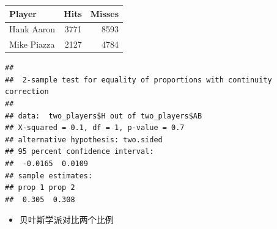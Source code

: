\documentclass[]{book}
\newenvironment{Shaded}{\begin{snugshade}}{\end{snugshade}}
\newcommand{\DataTypeTok}[1]{\textcolor[rgb]{0.13,0.29,0.53}{#1}}
\newcommand{\KeywordTok}[1]{\textcolor[rgb]{0.13,0.29,0.53}{\textbf{#1}}}
\newcommand{\NormalTok}[1]{#1}
\newcommand{\OperatorTok}[1]{\textcolor[rgb]{0.81,0.36,0.00}{\textbf{#1}}}
\newcommand{\StringTok}[1]{\textcolor[rgb]{0.31,0.60,0.02}{#1}}
\providecommand{\tightlist}{%
  \setlength{\itemsep}{0pt}\setlength{\parskip}{0pt}}
\begin{document}
\begin{Shaded}
\end{Shaded}

\begin{tabular}{l|r|r}
\hline
Player & Hits & Misses\\
\hline
Hank Aaron & 3771 & 8593\\
\hline
Mike Piazza & 2127 & 4784\\
\hline
\end{tabular}

\begin{Shaded}
\end{Shaded}

\begin{verbatim}
## 
##  2-sample test for equality of proportions with continuity correction
## 
## data:  two_players$H out of two_players$AB
## X-squared = 0.1, df = 1, p-value = 0.7
## alternative hypothesis: two.sided
## 95 percent confidence interval:
##  -0.0165  0.0109
## sample estimates:
## prop 1 prop 2 
##  0.305  0.308
\end{verbatim}

\begin{itemize}
\tightlist
\item
  贝叶斯学派对比两个比例
\end{itemize}
\end{document}
